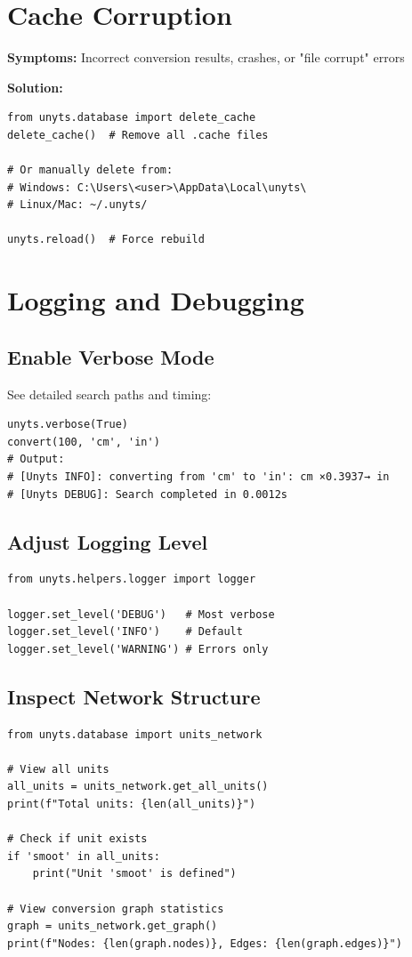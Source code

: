 \documentclass[11pt,a4paper]{report}
\begin{document}
\section{Cache Corruption}

\textbf{Symptoms:} Incorrect conversion results, crashes, or "file corrupt" errors

\textbf{Solution:}
\begin{lstlisting}[style=pythonstyle]
from unyts.database import delete_cache
delete_cache()  # Remove all .cache files

# Or manually delete from:
# Windows: C:\Users\<user>\AppData\Local\unyts\
# Linux/Mac: ~/.unyts/

unyts.reload()  # Force rebuild
\end{lstlisting}

\section{Logging and Debugging}

\subsection{Enable Verbose Mode}

See detailed search paths and timing:

\begin{lstlisting}[style=pythonstyle]
unyts.verbose(True)
convert(100, 'cm', 'in')
# Output:
# [Unyts INFO]: converting from 'cm' to 'in': cm ×0.3937→ in
# [Unyts DEBUG]: Search completed in 0.0012s
\end{lstlisting}

\subsection{Adjust Logging Level}

\begin{lstlisting}[style=pythonstyle]
from unyts.helpers.logger import logger

logger.set_level('DEBUG')   # Most verbose
logger.set_level('INFO')    # Default
logger.set_level('WARNING') # Errors only
\end{lstlisting}

\subsection{Inspect Network Structure}

\begin{lstlisting}[style=pythonstyle]
from unyts.database import units_network

# View all units
all_units = units_network.get_all_units()
print(f"Total units: {len(all_units)}")

# Check if unit exists
if 'smoot' in all_units:
    print("Unit 'smoot' is defined")

# View conversion graph statistics
graph = units_network.get_graph()
print(f"Nodes: {len(graph.nodes)}, Edges: {len(graph.edges)}")
\end{lstlisting}
\end{document}
